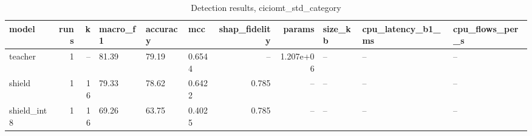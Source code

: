 \begin{table}
\caption{Detection results, ciciomt_std_category}
\begin{tabular}{lrrlllrrlll}
\toprule
model & runs & k & macro_f1 & accuracy & mcc & shap_fidelity & params & size_kb & cpu_latency_b1_ms & cpu_flows_per_s \\
\midrule
teacher & 1 & -- & 81.39 & 79.19 & 0.6544 & -- & 1.207e+06 & -- & -- & -- \\
shield & 1 & 16 & 79.33 & 78.62 & 0.6422 & 0.785 & -- & -- & -- & -- \\
shield_int8 & 1 & 16 & 69.26 & 63.75 & 0.4025 & 0.785 & -- & -- & -- & -- \\
\bottomrule
\end{tabular}
\end{table}
